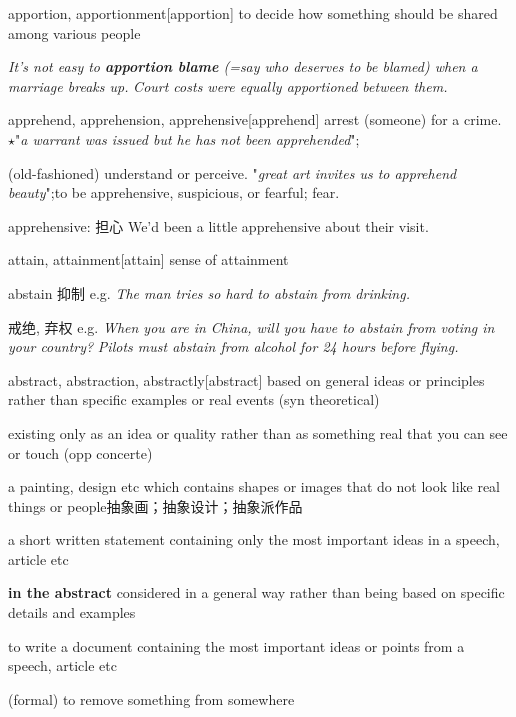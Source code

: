 \begin{DefWord}{apportion, apportionment}[apportion]
    to decide how something should be shared among various people

    \textit{It's not easy to \textbf{apportion blame} (=say who deserves to be blamed) when a marriage breaks up.}
    \textit{Court costs were equally apportioned between them.}
\end{DefWord}

\begin{DefWord}{apprehend, apprehension, apprehensive}[apprehend]
    arrest (someone) for a crime.
    $\star$"\textit{a warrant was issued but he has not been apprehended}";
    
    (old-fashioned) understand or perceive.
    "\textit{great art invites us to apprehend beauty}";to be apprehensive, suspicious, or fearful; fear.

    apprehensive: 担心 We'd been a little {apprehensive} about their visit.
\end{DefWord}

\begin{DefWord}{attain, attainment}[attain]
    sense of attainment
\end{DefWord}

\begin{DefWord}{abstain}
    抑制
    e.g. \textit{The man tries so hard to abstain from drinking.}
    
    戒绝,  弃权
    e.g. \textit{When you are in China, will you have to abstain from voting in your country?}
    \textit{Pilots must abstain from alcohol for 24 hours before flying.}
\end{DefWord}

\begin{DefWord}{abstract, abstraction, abstractly}[abstract]
    based on general ideas or principles rather than specific examples or real events (syn theoretical)

    existing only as an idea or quality rather than as something real that you can see or touch (opp concerte)

    a painting, design etc which contains shapes or images that do not look like real things or people抽象画；抽象设计；抽象派作品

    a short written statement containing only the most important ideas in a speech, article etc
    
    \textbf{in the abstract} considered in a general way rather than being based on specific details and examples

    to write a document containing the most important ideas or points from a speech, article etc

    (formal) to remove something from somewhere
\end{DefWord}

